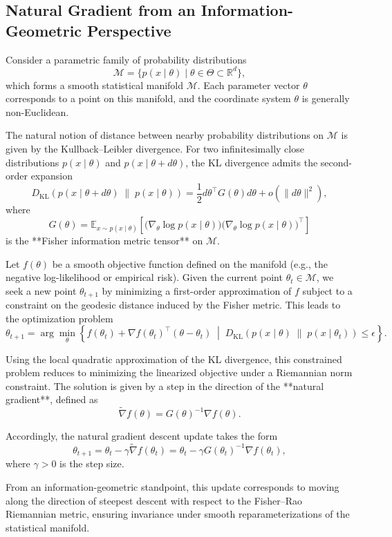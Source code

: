 \documentclass[12pt]{article}
\begin{document}
\subsection*{Natural Gradient from an Information-Geometric Perspective}

Consider a parametric family of probability distributions
\[
\mathcal{M} = \{ p(x \mid \theta) \mid \theta \in \Theta \subset \mathbb{R}^d \},
\]
which forms a smooth statistical manifold \(\mathcal{M}\). Each parameter vector \(\theta\) corresponds to a point on this manifold, and the coordinate system \(\theta\) is generally non-Euclidean.

The natural notion of distance between nearby probability distributions on \(\mathcal{M}\) is given by the Kullback--Leibler divergence. For two infinitesimally close distributions \(p(x \mid \theta)\) and \(p(x \mid \theta + d\theta)\), the KL divergence admits the second-order expansion
\[
D_{\mathrm{KL}}\!\left(
p(x \mid \theta + d\theta)
\;\|\;
p(x \mid \theta)
\right)
=
\frac{1}{2}
d\theta^\top
G(\theta)
d\theta
+
o(\|d\theta\|^2),
\]
where
\[
G(\theta)
=
\mathbb{E}_{x \sim p(x \mid \theta)}
\left[
\bigl( \nabla_\theta \log p(x \mid \theta) \bigr)
\bigl( \nabla_\theta \log p(x \mid \theta) \bigr)^\top
\right]
\]
is the **Fisher information metric tensor** on \(\mathcal{M}\).

Let \(f(\theta)\) be a smooth objective function defined on the manifold (e.g., the negative log-likelihood or empirical risk). Given the current point \(\theta_t \in \mathcal{M}\), we seek a new point \(\theta_{t+1}\) by minimizing a first-order approximation of \(f\) subject to a constraint on the geodesic distance induced by the Fisher metric. This leads to the optimization problem
\[
\theta_{t+1}
=
\arg\min_{\theta}
\left\{
f(\theta_t)
+
\nabla f(\theta_t)^\top (\theta - \theta_t)
\;\middle|\;
D_{\mathrm{KL}}\!\left(
p(x \mid \theta)
\;\|\;
p(x \mid \theta_t)
\right)
\le \epsilon
\right\}.
\]

Using the local quadratic approximation of the KL divergence, this constrained problem reduces to minimizing the linearized objective under a Riemannian norm constraint. The solution is given by a step in the direction of the **natural gradient**, defined as
\[
\widetilde{\nabla} f(\theta)
=
G(\theta)^{-1}
\nabla f(\theta).
\]

Accordingly, the natural gradient descent update takes the form
\[
\theta_{t+1}
=
\theta_t
-
\gamma
\widetilde{\nabla} f(\theta_t)
=
\theta_t
-
\gamma
G(\theta_t)^{-1}
\nabla f(\theta_t),
\]
where \(\gamma > 0\) is the step size.

From an information-geometric standpoint, this update corresponds to moving along the direction of steepest descent with respect to the Fisher–Rao Riemannian metric, ensuring invariance under smooth reparameterizations of the statistical manifold.
\end{document}
